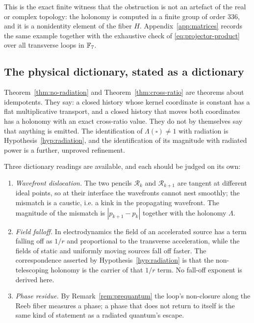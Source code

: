 This is the exact finite witness that the obstruction is not an artefact of the
real or complex topology: the holonomy is computed in a finite group of order
$336$, and it is a nonidentity element of the fiber $H$.  Appendix~\ref{app:matrices}
records the same example together with the exhaustive check of
\eqref{eq:projector-product} over all transverse loops in $\mathbb{F}_7$.

\subsection{The physical dictionary, stated as a dictionary}

\begin{warning}
\label{warn:radiation}
Theorem~\ref{thm:no-radiation} and Theorem~\ref{thm:cross-ratio} are theorems
about idempotents.  They say: a closed history whose kernel coordinate is
constant has a flat multiplicative transport, and a closed history that moves
both coordinates has a holonomy with an exact cross-ratio value.  They do not by
themselves say that anything is emitted.  The identification of
$\Lambda(\square)\ne1$ with radiation is Hypothesis~\ref{hyp:radiation}, and the
identification of its magnitude with radiated power is a further, unproved
refinement.

Three dictionary readings are available, and each should be judged on its own:
\begin{enumerate}[label=(\alph*)]
  \item \emph{Wavefront dislocation.}  The two pencils $\mathcal R_k$ and
  $\mathcal R_{k+1}$ are tangent at different ideal points, so at their interface
  the wavefronts cannot nest smoothly; the mismatch is a caustic, i.e. a kink in
  the propagating wavefront.  The magnitude of the mismatch is
  $|p_{k+1}-p_k|$ together with the holonomy $\Lambda$.
  \item \emph{Field falloff.}  In electrodynamics the field of an accelerated
  source has a term falling off as $1/r$ and proportional to the transverse
  acceleration, while the fields of static and uniformly moving sources fall off
  faster.  The correspondence asserted by Hypothesis~\ref{hyp:radiation} is that
  the non-telescoping holonomy is the \AEG{} carrier of that $1/r$ term.  No
  fall-off exponent is derived here.
  \item \emph{Phase residue.}  By Remark~\ref{rem:prequantum} the loop's
  non-closure along the Reeb fiber measures a phase; a phase that does not return
  to itself is the same kind of statement as a radiated quantum's escape.
\end{enumerate}
\end{warning}

